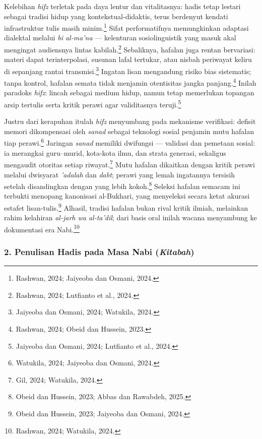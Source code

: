 Kelebihan \textit{hifz} terletak pada daya lentur dan vitalitasnya: hadis tetap lestari sebagai tradisi hidup yang kontekstual-didaktis, terus berdenyut kendati infrastruktur tulis masih minim.\footnote{Rashwan, 2024; Jaiyeoba dan Osmani, 2024.} Sifat performatifnya memungkinkan adaptasi dialektal melalui \textit{bi al-ma'na} --- kelenturan sosiolinguistik yang masuk akal mengingat audiensnya lintas kabilah.\footnote{Rashwan, 2024; Lutfianto et al., 2024.} Sebaliknya, hafalan juga rentan bervariasi: materi dapat terinterpolasi, susunan lafal tertukar, atau nisbah periwayat keliru di sepanjang rantai transmisi.\footnote{Jaiyeoba dan Osmani, 2024; Watukila, 2024.} Ingatan lisan mengandung risiko bias sistematis; tanpa kontrol, hafalan semata tidak menjamin otentisitas jangka panjang.\footnote{Rashwan, 2024; Obeid dan Hussein, 2023.} Inilah paradoks \textit{hifz}: lincah sebagai medium hidup, namun tetap memerlukan topangan arsip tertulis serta kritik perawi agar validitasnya teruji.\footnote{Jaiyeoba dan Osmani, 2024; Lutfianto et al., 2024.}

Justru dari kerapuhan itulah \textit{hifz} menyumbang pada mekanisme verifikasi: defisit memori dikompensasi oleh \textit{sanad} sebagai teknologi sosial penjamin mutu hafalan tiap perawi.\footnote{Watukila, 2024; Jaiyeoba dan Osmani, 2024.} Jaringan \textit{sanad} memiliki dwifungsi --- validasi dan pemetaan sosial: ia merangkai guru--murid, kota-kota ilmu, dan strata generasi, sekaligus mengaudit otoritas setiap riwayat.\footnote{Gil, 2024; Watukila, 2024.} Mutu hafalan dikaitkan dengan kritik perawi melalui dwisyarat \textit{'adalah} dan \textit{dabt}; perawi yang lemah ingatannya tersisih setelah disandingkan dengan yang lebih kokoh.\footnote{Obeid dan Hussein, 2023; Abbas dan Rawabdeh, 2025.} Seleksi hafalan semacam ini terbukti menopang kanonisasi al-Bukhari, yang menyeleksi secara ketat akurasi estafet lisan-tulis.\footnote{Obeid dan Hussein, 2023; Jaiyeoba dan Osmani, 2024.} Alhasil, tradisi hafalan bukan rival kritik ilmiah, melainkan rahim kelahiran \textit{al-jarh wa al-ta'dil}; dari basis oral inilah wacana menyambung ke dokumentasi era Nabi.\footnote{Rashwan, 2024; Watukila, 2024.}

\subsubsection*{2. Penulisan Hadis pada Masa Nabi (\textit{Kitabah})}


